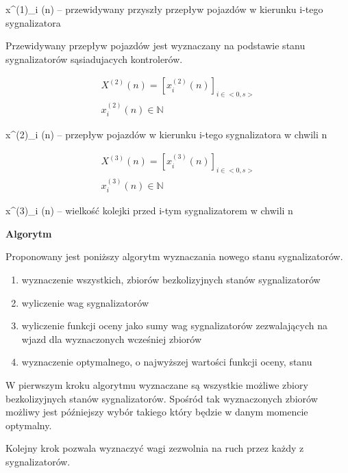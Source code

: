 x^{(1)}_{i} (n) \textrm{ -- przewidywany przyszły przepływ pojazdów w kierunku i-tego sygnalizatora}

Przewidywany przepływ pojazdów jest wyznaczany na podstawie stanu sygnalizatorów sąsiadujacych kontrolerów.

\begin{equation}
	\begin{array}{c}
		X^{(2)} (n) = \left[ x^{(2)}_{i} (n) \right]_{i \in <0,s>}\\
		x^{(2)}_{i} (n) \in \mathbb{N}
	\end{array}
\end{equation}

x^{(2)}_{i} (n) \textrm{ -- przepływ pojazdów w kierunku i-tego sygnalizatora w chwili n}

\begin{equation}
	\begin{array}{c}
		X^{(3)} (n) = \left[ x^{(3)}_{i} (n) \right]_{i \in <0,s>}\\
		x^{(3)}_{i} (n) \in \mathbb{N}
	\end{array}
\end{equation}

x^{(3)}_{i} (n) \textrm{ -- wielkość kolejki przed i-tym sygnalizatorem w chwili n}

\vspace{1.5cm}
\textbf{Algorytm}

Proponowany jest poniższy algorytm wyznaczania nowego stanu sygnalizatorów.
\begin{enumerate}
	\item wyznaczenie wszystkich, zbiorów bezkolizyjnych stanów sygnalizatorów
	\item wyliczenie wag sygnalizatorów
	\item wyliczenie funkcji oceny jako sumy wag sygnalizatorów zezwalających na wjazd dla wyznaczonych wcześniej zbiorów
	\item wyznaczenie optymalnego, o najwyższej wartości funkcji oceny, stanu
\end{enumerate}

\vspace{0.5cm}
W pierwszym kroku algorytmu wyznaczane są wszystkie możliwe zbiory bezkolizyjnych stanów sygnalizatorów.
Spośród tak wyznaczonych zbiorów możliwy jest późniejszy wybór takiego który będzie w danym momencie optymalny.

\vspace{0.5cm}
Kolejny krok pozwala wyznaczyć wagi zezwolnia na ruch przez każdy z sygnalizatorów.

